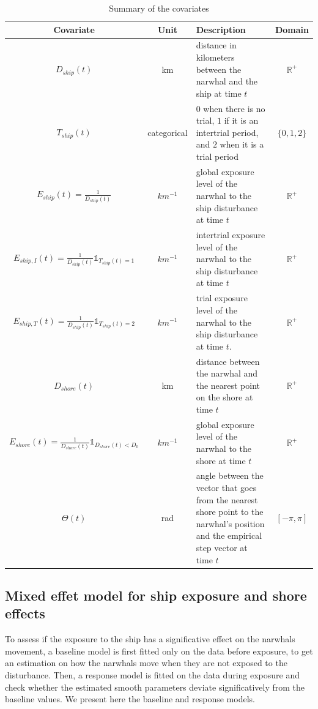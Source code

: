 \documentclass[11pt]{article}
\newcommand {\R}{\mathbb{R}}
\newcommand {\1}{\mathbb{1}}
\begin{document}
\begin{table}[H]
	\centering
	\begin{tabular}{|c|c|p{8cm}|c|}
		\hline
		Covariate & Unit & Description & Domain \\
		\hline
		$D_{ship}(t)$ & km & distance in kilometers between the narwhal and the ship at time $t$ & $\R^+$ \\
		\hline
		$T_{ship}(t)$  & categorical & $0$ when there is no trial, $1$ if it is an intertrial period, and $2$ when it is a trial period & $\{0,1,2\}$\\
		\hline
		$E_{ship}(t)=\frac{1}{D_{ship}(t)}$ & $km^{-1}$ & global exposure level of the narwhal to the ship disturbance at time $t$ & $\R^+$ \\
		\hline
		$E_{ship,I}(t)=\frac{1}{D_{ship}(t)}\mathbb{1}_{T_{ship}(t)=1}$& $km^{-1}$ & intertrial exposure level of the narwhal to the ship disturbance at time $t$ & $\R^+$ \\
		\hline
		$E_{ship,T}(t)=\frac{1}{D_{ship}(t)}\mathbb{1}_{T_{ship}(t)=2}$ & $km^{-1}$ & trial exposure level of the narwhal to the ship disturbance at time $t$. & $\R^+$\\
		\hline
		$D_{shore}(t)$ & km & distance between the narwhal and the nearest point on the shore at time $t$ & $\R^+$ \\
		\hline
		$E_{shore}(t)=\frac{1}{D_{shore}(t)} \1_{D_{shore}(t)<D_0}$ & $km^{-1}$ & global exposure level of the narwhal to the shore at time $t$ & $\R^+$ \\
		\hline
		$\Theta(t)$ & rad & angle between the vector that goes from the nearest shore point to the narwhal's position and the empirical step vector at time $t$  & $[-\pi,\pi]$ \\
		\hline 
	\end{tabular}
	\caption{Summary of the covariates}
	\label{tab: covariates}
\end{table}






\subsection{Mixed effet model for ship exposure and shore effects}
\label{subsection: ship exposure effect}


To assess if the exposure to the ship has a significative effect on the narwhals movement, a baseline model is first fitted only on the data before exposure, to get an estimation on how the narwhals move when they are not exposed to the disturbance. Then, a response model is fitted on the data during exposure and check whether the estimated smooth parameters deviate significatively from the baseline values. We present here the baseline and response models.\\
\end{document}
